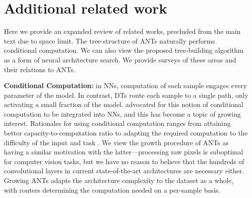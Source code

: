 \section{Additional related work}\label{sec:supp_related_work}
Here we provide an expanded review of related works, precluded from the main text due to space limit. The tree-structure of ANTs naturally performs conditional computation. We can also view the proposed tree-building algorithm as a form of neural architecture search. We provide surveys of these areas and their relations to ANTs.

\textbf{Conditional Computation:} in NNs, computation of each sample engages every parameter of the model. In contrast, DTs route each sample to a single path, only activating a small fraction of the model. \citet{bengio2013deep} advocated for this notion of conditional computation to be integrated into NNs, and this has become a topic of growing interest. Rationales for using conditional computation ranges from attaining better capacity-to-computation ratio \citep{bengio2013estimating,davis2013low,bengio2015conditional,Shazeer2017OutrageouslyLN} to adapting the required computation to the difficulty of the input and task \citep{bengio2015conditional,almahairi2016dynamic,Teerapittayanon2016BranchyNetFI,Graves2016AdaptiveCT,Figurnov2017SpatiallyAC,veit2017convolutional}. We view the growth procedure of ANTs as having a similar motivation with the latter---processing raw pixels is suboptimal for computer vision tasks, but we have no reason to believe that the hundreds of convolutional layers in current state-of-the-art architectures \citep{he2016deep,huang2017densely} are necessary either. Growing ANTs adapts the architecture complexity to the dataset as a whole, with routers determining the computation needed on a per-sample basis. 
